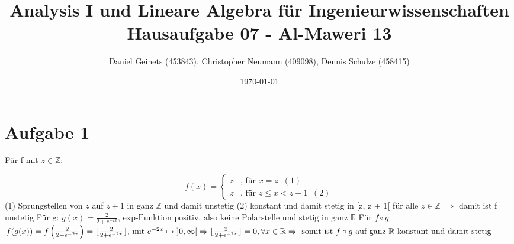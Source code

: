 \documentclass[a4paper, 11pt]{article}
\author{Daniel Geinets (453843), Christopher Neumann (409098), Dennis Schulze (458415)}
\date{\today}
\title{Analysis I und Lineare Algebra für Ingenieurwissenschaften \large  \\ Hausaufgabe 07 - Al-Maweri 13}
\begin{document}
\maketitle
\tableofcontents

\setcounter{secnumdepth}{0}
\newcommand{\tuple}[1]{\left(#1\right)}
\renewcommand{\cfrac}[3]{#1 \tuple{\frac{#2}{#3}}}
\newcommand{\R}{\mathbb{R}}
\newcommand{\Z}{\mathbb{Z}}
\newcommand{\Q}{\mathbb{Q}}
\newcommand{\N}{\mathbb{N}}
\newcommand{\C}{\mathbb{C}}

\makeatletter
\renewcommand*\env@matrix[1][*\c@MaxMatrixCols c]{%
\hskip -\arraycolsep
\let\@ifnextchar\new@ifnextchar
\array{#1}}
\makeatother

\pagebreak

\section{Aufgabe 1}
\label{sec:orga811001}

Für f mit \(z \in \Z\):
\newline

$$ f(x) =
    \begin{cases}
        z   & \text{, für } x = z \;\;(1) \\
        z   & \text{, für } z \leq x < z + 1 \;\;(2)
    \end{cases} $$
\newline
\newline
(1) Sprungstellen von \(z\) auf \(z + 1\)
    in ganz \(\Z\) und damit unstetig \newline
(2) konstant und damit stetig in [z, z + 1[
    für alle \(z \in \Z\) \newline
\(\Rightarrow\) damit ist f unstetig \newline
\newline
Für g:
\newline
\newline
\begin{math}
    g(x) = \frac{2}{2 + e^{-2x}}
    \text{, exp-Funktion positiv, also keine Polarstelle und stetig in ganz }\mathbb{R}
\end{math}
\newline
\newline
Für \(f \circ g\):
\newline
\newline
\begin{math}
    f(g(x)) = f\left(\frac{2}{2 + e^{-2x}}\right) =
        \lfloor \frac{2}{2 + e^{-2x}} \rfloor \text{, mit }
    e^{-2x} \mapsto \; ]0, \infty[ \\
    \Rightarrow \lfloor \frac{2}{2 + e^{-2x}} \rfloor = 0, \forall x \in \R \\
    \Rightarrow \text{ somit ist } f \circ g \text{ auf ganz } \R
    \text{ konstant und damit stetig}
\end{math}
\end{document}
